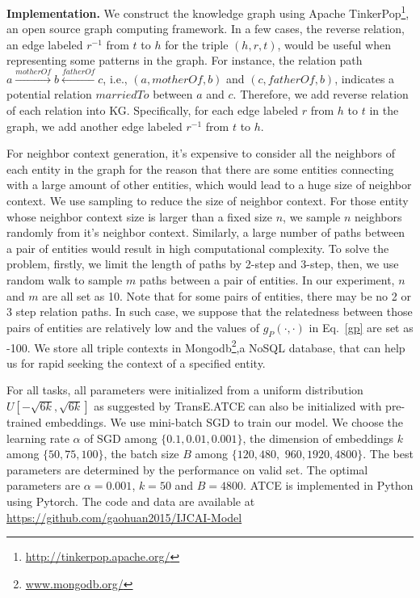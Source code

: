 \textbf{Implementation.}
We construct the knowledge graph using Apache TinkerPop\footnote{\url{http://tinkerpop.apache.org/}}, an open source graph computing framework. In a few cases, the reverse relation, an edge labeled $r^{-1}$ from $t$ to $h$ for the triple $(h,r,t)$, would be useful when representing some patterns in the graph. For instance, the relation path $a \xrightarrow{motherOf} b \xleftarrow{fatherOf} c$, i.e., $(a, motherOf, b)$ and $(c, fatherOf, b)$, indicates a potential relation $marriedTo$ between $a$ and $c$. Therefore, we add reverse relation of each relation into KG. Specifically, for each edge labeled $r$ from $h$ to $t$ in the graph, we add another edge labeled $r^{-1}$ from $t$ to $h$.

For neighbor context generation, it's expensive to consider all the neighbors of each entity in the graph for the reason that there are some entities connecting with a large amount of other entities, which would lead to a huge size of neighbor context. We use sampling to reduce the size of neighbor context. For those entity whose neighbor context size is larger than a fixed size $n$, we sample $n$ neighbors randomly from it's neighbor context. Similarly, a large number of paths between a pair of entities would result in high computational complexity. To solve the problem, firstly, we limit the length of paths by 2-step and 3-step, then, we use random walk to sample $m$ paths between a pair of entities. In our experiment, $n$ and $m$ are all set as 10. Note that for some pairs of entities, there may be no 2 or 3 step relation paths. In such case, we suppose that the relatedness between those pairs of entities are relatively low and the values of $g_P(\cdot, \cdot)$ in Eq.~\eqref{gp} are set as -100. We store all triple contexts in Mongodb\footnote{\url{www.mongodb.org/}},a NoSQL database, that can help us for rapid seeking the context of a specified entity.

For all tasks, all parameters were initialized from a uniform distribution $U[-\sqrt{6k}, \sqrt{6k}]$ as suggested by TransE.ATCE can also be initialized with pre-trained embeddings. We use mini-batch SGD to train our model. We choose the learning rate $\alpha$ of SGD among $\{0.1, 0.01, 0.001\}$, the dimension of embeddings $k$ among $\{50, 75, 100\}$, the batch size $B$ among $\{120, 480,$ $ 960, 1920, 4800\}$. The best parameters are determined by the performance on valid set. The optimal parameters are $\alpha=0.001$, $k=50$ and $B=4800$. ATCE is implemented in Python using Pytorch. The code and data are available at \url{https://github.com/gaohuan2015/IJCAI-Model}

